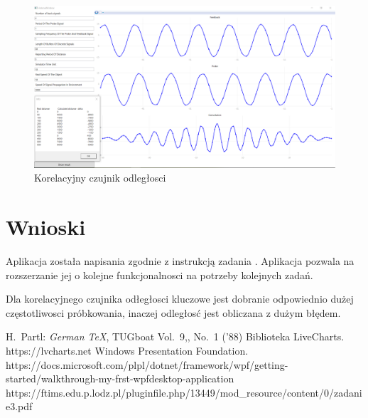 \documentclass[12pt]{article}
\begin{document}
\begin{figure}[H]
 \centering
 \includegraphics[width=14cm]{images/a3.PNG}
 \vspace{-0.3cm}
 \caption{Korelacyjny czujnik odległosci}
 \label{gui}
\end{figure}


\newpage

\section{Wnioski}

Aplikacja została napisania zgodnie z instrukcją zadania \cite{zad}. Aplikacja pozwala na rozszerzanie jej o kolejne funkcjonalnosci na potrzeby kolejnych zadań. 

Dla korelacyjnego czujnika odłegłosci kluczowe jest dobranie odpowiednio dużej częstotliwosci próbkowania, inaczej odległosć jest obliczana z dużym błędem.





\begin{thebibliography}{99}
 H.~Partl:
\emph{German \TeX},
TUGboat Vol.~9,, No.~1 ('88)
 Biblioteka LiveCharts. https://lvcharts.net
 Windows Presentation Foundation. https://docs.microsoft.com/plpl/dotnet/framework/wpf/getting-started/walkthrough-my-frst-wpfdesktop-application
 https://ftims.edu.p.lodz.pl/pluginfile.php/13449/mod\_resource/content/0/zadanie3.pdf
\end{thebibliography}
\end{document}
